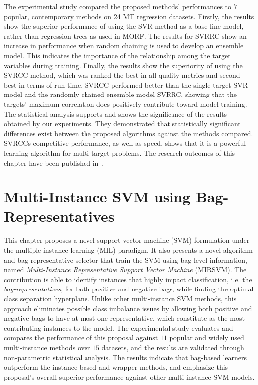 \documentclass[reqno]{vcuthesis}
\numberwithin{equation}{chapter}
\begin{document}
The experimental study compared the proposed methods' performances to $7$ popular, contemporary methods on 24 MT regression datasets. Firstly, the results show the superior performance of using the SVR method as a base-line model, rather than regression trees as used in MORF. The results for SVRRC show an increase in performance when random chaining is used to develop an ensemble model. This indicates the importance of the relationship among the target variables during training. Finally, the results show the superiority of using the SVRCC method, which was ranked the best in all quality metrics and second best in terms of run time. SVRCC performed better than the single-target SVR model and the randomly chained ensemble model SVRRC, showing that the targets' maximum correlation does positively contribute toward model training. The statistical analysis supports and shows the significance of the results obtained by our experiments. They demonstrated that statistically significant differences exist between the proposed algorithms against the methods compared. SVRCCs competitive performance, as well as speed, shows that it is a powerful learning algorithm for multi-target problems. The research outcomes of this chapter have been published in~\cite{melki2017multi}.

\chapter{Multi-Instance SVM using Bag-Representatives} \label{chap:mirsvm}
This chapter proposes a novel support vector machine (SVM) formulation under the multiple-instance learning (MIL) paradigm. It also presents a novel algorithm and bag representative selector that train the SVM using bag-level information, named \textit{Multi-Instance Representative Support Vector Machine} (MIRSVM). The contribution is able to identify instances that highly impact classification, i.e. the \textit{bag-representatives}, for both positive and negative bags, while finding the optimal class separation hyperplane. Unlike other multi-instance SVM methods, this approach eliminates possible class imbalance issues by allowing both positive and negative bags to have at most one representative, which constitute as the most contributing instances to the model. The experimental study evaluates and compares the performance of this proposal against $11$ popular and widely used multi-instance methods over $15$ datasets, and the results are validated through non-parametric statistical analysis. The results indicate that bag-based learners outperform the instance-based and wrapper methods, and emphasize this proposal's overall superior performance against other multi-instance SVM models. 
\end{document}

